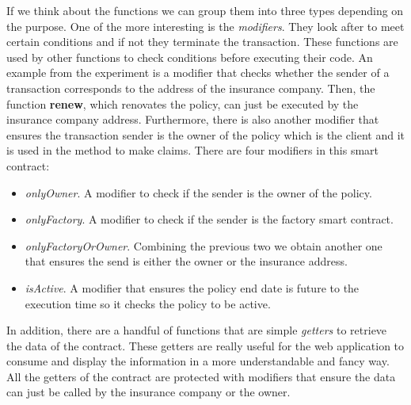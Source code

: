 {If we think about the functions we can group them into three types depending on the purpose. One of the more interesting is the \textit{modifiers}. They look after to meet certain conditions and if not they terminate the transaction. These functions are used by other functions to check conditions before executing their code. An example from the experiment is a modifier that checks whether the sender of a transaction corresponds to the address of the insurance company. Then, the function \textbf{renew}, which renovates the policy, can just be executed by the insurance company address. Furthermore, there is also another modifier that ensures the transaction sender is the owner of the policy which is the client and it is used in the method to make claims. There are four modifiers in this smart contract:
\begin{itemize}
    \item \textit{onlyOwner}. A modifier to check if the sender is the owner of the policy.
    \item \textit{onlyFactory}. A modifier to check if the sender is the factory smart contract.
    \item \textit{onlyFactoryOrOwner}. Combining the previous two we obtain another one that ensures the send is either the owner or the insurance address.
    \item \textit{isActive}. A modifier that ensures the policy end date is future to the execution time so it checks the policy to be active.
\end{itemize}

In addition, there are a handful of functions that are simple \textit{getters} to retrieve the data of the contract. These getters are really useful for the web application to consume and display the information in a more understandable and fancy way. All the getters of the contract are protected with modifiers that ensure the data can just be called by the insurance company or the owner.

}
